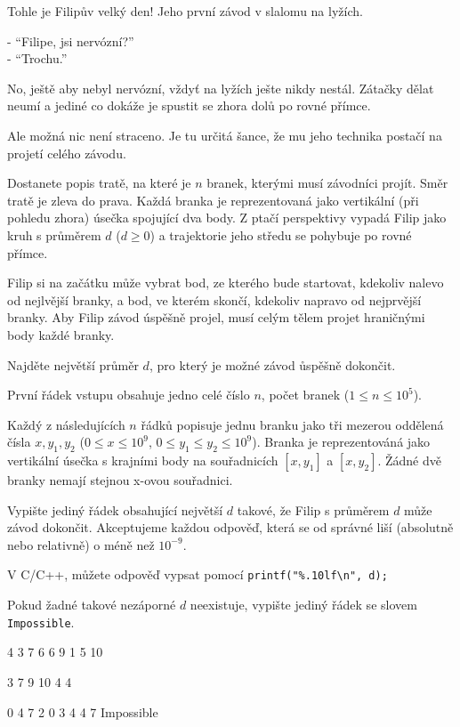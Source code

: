 





Tohle je Filipův velký den! Jeho první závod v slalomu na lyžích.

\bigskip \noindent
- ``Filipe, jsi nervózní?''\\
- ``Trochu.''
\bigskip \noindent

No, ještě aby nebyl nervózní, vždyť na lyžích ješte nikdy nestál.
Zátačky dělat neumí a jediné co dokáže je spustit se zhora dolů po rovné přímce.

Ale možná nic není straceno.
Je tu určitá šance, že mu jeho technika postačí na projetí celého závodu.


Dostanete popis tratě, na které je $n$ branek, kterými musí závodníci projít.
Směr tratě je zleva do prava.
Každá branka je reprezentovaná jako vertikální (při pohledu zhora) úsečka spojující dva body.
Z ptačí perspektivy vypadá Filip jako kruh s průměrem $d$ ($d \geq 0$) a
trajektorie jeho středu se pohybuje po rovné přímce.

Filip si na začátku může vybrat bod, ze kterého bude startovat, kdekoliv nalevo od nejlvější branky,
a bod, ve kterém skončí, kdekoliv napravo od nejprvější branky.
Aby Filip závod úspěšně projel, musí celým tělem projet hraničnými body každé branky.

Najděte největší průměr $d$, pro který je možné závod ůspěšně dokončit.



První řádek vstupu obsahuje jedno celé číslo $n$, počet branek ($1 \leq n \leq 10^5$).

Každý z následujících $n$ řádků popisuje jednu branku jako tři mezerou oddělená čísla $x, y_1, y_2$ ($0 \leq x \leq 10^9$,
$0 \leq y_1 \leq y_2 \leq 10^9$).
Branka je reprezentováná jako vertikální úsečka s krajními body na souřadnicích $[x, y_1]$ a $[x, y_2]$.
Žádné dvě branky nemají stejnou x-ovou souřadnici.


Vypište jediný řádek obsahující největší $d$ takové, že Filip s průměrem $d$ může závod dokončit.
Akceptujeme každou odpověď, která se od správné liší (absolutně nebo relativně) o méně než $10^{-9}$.

V C/C++, můžete odpověď vypsat pomocí \verb!printf("%.10lf\n", d);!

Pokud žadné takové nezáporné $d$ neexistuje, vypište jediný řádek se slovem \texttt{Impossible}.



4 3 7
6 6 9
1 5 10
\sampleEND

3 7 9
10 4 4
\sampleEND

0 4 7
2 0 3
4 4 7
\sampleOUT
Impossible
\sampleEND



